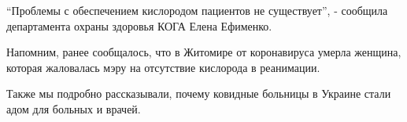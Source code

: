\enquote{Проблемы с обеспечением кислородом пациентов не существует}, - сообщила
департамента охраны здоровья КОГА Елена Ефименко.

Напомним, ранее сообщалось, что в Житомире от коронавируса умерла женщина,
которая жаловалась мэру на отсутствие кислорода в реанимации.

Также мы подробно рассказывали, почему ковидные больницы в Украине стали
адом для больных и врачей.


